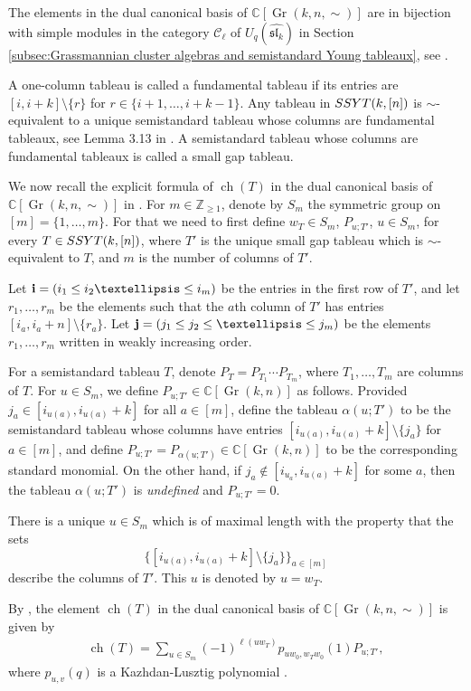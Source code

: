 \documentclass[12pt, reqno]{amsart}
\theoremstyle{plain}
\theoremstyle{definition}
\numberwithin{equation}{section}
\newcommand{\CC}{{\mathbb {C}}}
\newcommand{\ZZ}{{\mathbb {Z}}}
\newcommand{\ch}{{\operatorname{ch}}}
\newcommand{\SSYT}{{\rm SSYT}}
\DeclareMathOperator{\Gr}{Gr}
\begin{document}
The elements in the dual canonical basis of $\CC[\Gr(k,n,\sim)]$ are in bijection with simple modules in the category $\mathcal{C}_{\ell}$ of $U_q(\widehat{\mathfrak{sl}_k})$ in Section \ref{subsec:Grassmannian cluster algebras and semistandard Young tableaux}, see \cite{HL10, CDFL}.

A one-column tableau is called a fundamental tableau if its entries are $[i,i+k] \setminus \{r\}$ for $r \in \{i+1, \ldots, i+k-1\}$. 
Any tableau in $\SSYT(k,[n])$ is $\sim$-equivalent to a unique semistandard tableau whose columns are fundamental tableaux, see Lemma 3.13 in \cite{CDFL}. A semistandard tableau whose columns are fundamental tableaux is called a small gap tableau. 

We now recall the explicit formula of $\ch(T)$ in the dual canonical basis of $\CC[\Gr(k,n,\sim)]$ in \cite[Theorem 5.8]{CDFL}. For $m \in \ZZ_{\ge 1}$, denote by $S_m$ the symmetric group on $[m] = \{1, \ldots, m\}$. For that we need to first define $w_T \in S_m$, $P_{u; T'}$, $u \in S_m$, for every $T \in \SSYT(k, [n])$, where $T'$ is the unique small gap tableau which is $\sim$-equivalent to $T$, and $m$ is the number of columns of $T'$. 

Let ${\bf i} = (i_1 \leq i_2 \dots \leq i_m)$ be the entries in the first row of $T'$, and let $r_1,\dots,r_m$ be the elements such that the $a$th column of $T'$ has entries $[i_a,i_a+n] \setminus \{r_a\}$. Let ${\bf j} = (j_1 \leq j_2 \leq \dots \leq j_m)$ be the elements $r_1,\dots,r_m$ written in weakly increasing order. 

For a semistandard tableau $T$, denote $P_T = P_{T_1} \cdots P_{T_m}$, where $T_1, \ldots, T_m$ are columns of $T$. For $u \in S_m$, we define $P_{u;T'} \in \CC[\Gr(k,n)]$ as follows. Provided $j_a \in [i_{u(a)}, i_{u(a)}+k]$ for all $a \in [m]$, define the tableau $\alpha(u;T')$ to be the semistandard tableau whose columns have entries $[i_{u(a)}, i_{u(a)}+k] \setminus \{j_a\}$ for $a \in [m]$, and define $P_{u; T'} = P_{\alpha(u;T')} \in \CC[\Gr(k,n)]$ to be the corresponding standard monomial. On the other hand, if $j_a \notin [i_{u_a}, i_{u(a)}+k]$ for some $a$, then the tableau $\alpha(u;T')$ is {\sl undefined} and $P_{u ;T'} = 0$. 

There is a unique $u \in S_m$ which is of maximal length with the property that the sets 
\[
\{[i_{u(a)},i_{u(a)}+k] \setminus \{j_a \} \}_{a \in [m]}
\]
describe the columns of $T'$. This $u$ is denoted by $u = w_{T}$.

By \cite[Theorem 5.8]{CDFL}, the element $\ch(T)$ in the dual canonical basis of $\CC[\Gr(k,n,\sim)]$ is given by 
\begin{align}\label{eq:formula of ch(T)}
\ch(T) = \sum_{u \in S_m} (-1)^{\ell(uw_T)} p_{uw_0, w_Tw_0}(1) P_{u; T'},
\end{align}
where $p_{u,v}(q)$ is a Kazhdan-Lusztig polynomial \cite{KL79}.
\end{document}
